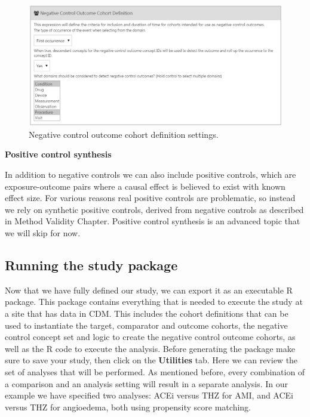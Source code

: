 \documentclass[]{book}
\begin{document}
\begin{figure}

{\centering \includegraphics[width=1\linewidth]{images/PopulationLevelEstimation/ncSettings} 

}

\caption{Negative control outcome cohort definition settings.}\label{fig:ncSettings}
\end{figure}

\textbf{Positive control synthesis}

In addition to negative controls we can also include positive controls, which are exposure-outcome pairs where a causal effect is believed to exist with known effect size. For various reasons real positive controls are problematic, so instead we rely on synthetic positive controls, derived from negative controls as described in Method Validity Chapter. Positive control synthesis is an advanced topic that we will skip for now.

\hypertarget{running-the-study-package}{%
\subsection{Running the study package}\label{running-the-study-package}}

Now that we have fully defined our study, we can export it as an executable R package. This package contains everything that is needed to execute the study at a site that has data in CDM. This includes the cohort definitions that can be used to instantiate the target, comparator and outcome cohorts, the negative control concept set and logic to create the negative control outcome cohorts, as well as the R code to execute the analysis. Before generating the package make sure to save your study, then click on the \textbf{Utilities} tab. Here we can review the set of analyses that will be performed. As mentioned before, every combination of a comparison and an analysis setting will result in a separate analysis. In our example we have specified two analyses: ACEi versus THZ for AMI, and ACEi versus THZ for angioedema, both using propensity score matching.
\end{document}
